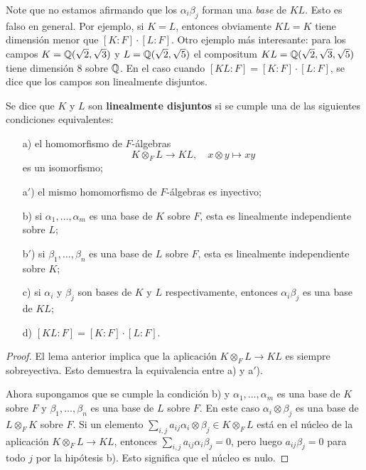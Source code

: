 Note que no estamos afirmando que los $\alpha_i \beta_j$ forman una \emph{base}
de $KL$. Esto es falso en general. Por ejemplo, si $K = L$, entonces obviamente
$KL = K$ tiene dimensión menor que $[K : F]\cdot [L : F]$. Otro ejemplo más
interesante: para los campos $K = \mathbb{Q} (\sqrt{2},\sqrt{3})$ y
$L = \mathbb{Q} (\sqrt{2},\sqrt{5})$ el compositum
$KL = \mathbb{Q} (\sqrt{2},\sqrt{3},\sqrt{5})$ tiene dimensión $8$ sobre $\mathbb{Q}$.
En el caso cuando $[KL : F] = [K : F]\cdot [L : F]$, se dice que los campos
son linealmente disjuntos.

\begin{proposicion-definicion}
  Se dice que $K$ y $L$ son \textbf{linealmente disjuntos} si se cumple una de
  las siguientes condiciones equivalentes:
  \begin{enumerate}
  \item[a)] el homomorfismo de $F$-álgebras
    $$K\otimes_F L\to K L, \quad x\otimes y \mapsto xy$$
    es un isomorfismo;

  \item[a${}'$)] el mismo homomorfismo de $F$-álgebras es inyectivo;

  \item[b)] si $\alpha_1, \ldots, \alpha_m$ es una base de $K$ sobre $F$, esta
    es linealmente independiente sobre $L$;

  \item[b${}'$)] si $\beta_1, \ldots, \beta_n$ es una base de $L$ sobre $F$,
    esta es linealmente independiente sobre $K$;

  \item[c)] si $\alpha_i$ y $\beta_j$ son bases de $K$ y $L$ respectivamente,
    entonces $\alpha_i \beta_j$ es una base de $K L$;

  \item[d)] $[KL : F] = [K : F]\cdot [L : F]$.
  \end{enumerate}

  \begin{proof}
    El lema anterior implica que la aplicación $K\otimes_F L\to K L$ es siempre
    sobreyectiva. Esto demuestra la equivalencia entre a) y a${}'$).

    Ahora supongamos que se cumple la condición b) y $\alpha_1,\ldots,\alpha_m$
    es una base de $K$ sobre $F$ y $\beta_1, \ldots, \beta_n$ es una base de
    $L$ sobre $F$. En este caso $\alpha_i\otimes\beta_j$ es una base
    de $L\otimes_F K$ sobre $F$. Si un elemento
    $\sum_{i,j} a_{ij} \alpha_i\otimes \beta_j \in K\otimes_F L$
    está en el núcleo de la aplicación $K\otimes_F L\to K L$, entonces
    $\sum_{i,j} a_{ij} \alpha_i\beta_j = 0$, pero luego $a_{ij} \beta_j = 0$
    para todo $j$ por la hipótesis b). Esto significa que el núcleo es nulo.


\end{proof}
\end{proposicion-definicion}
